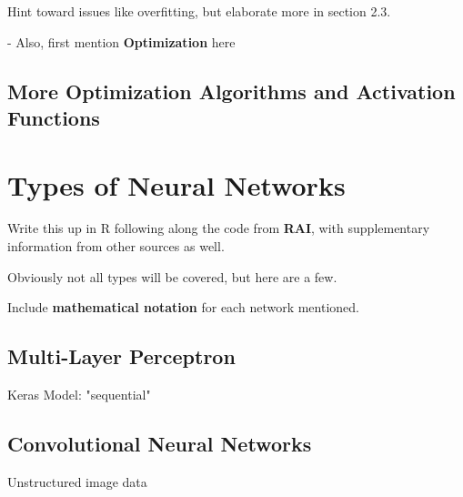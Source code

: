 Hint toward issues like overfitting, but elaborate more in section 2.3.

- Also, first mention \textbf{Optimization} here






\subsection{More Optimization Algorithms and Activation Functions}

\section{Types of Neural Networks} %

Write this up in R following along the code from \textbf{RAI}, with supplementary information from other sources as well.  

Obviously not all types will be covered, but here are a few.  

Include \textbf{mathematical notation} for each network mentioned.

\subsection{Multi-Layer Perceptron}
Keras Model: "sequential"

\subsection{Convolutional Neural Networks}
Unstructured image data

